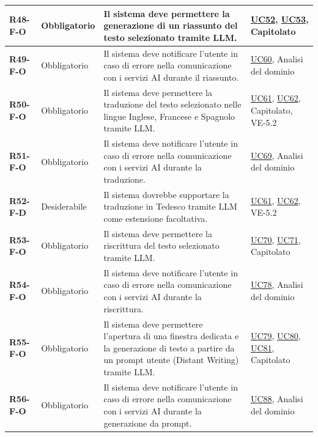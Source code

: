 \begin{longtable}{|p{2.5cm}|p{2.2cm}|p{6.8cm}|p{2.7cm}|}
	\textbf{R48-F-O} & Obbligatorio & Il sistema deve permettere la generazione di un riassunto del testo selezionato tramite LLM. & \hyperlink{uc52}{UC52}, \hyperlink{uc53}{UC53}, Capitolato \\ \hline
	\textbf{R49-F-O} & Obbligatorio & Il sistema deve notificare l'utente in caso di errore nella comunicazione con i servizi AI durante il riassunto. & \hyperlink{uc60}{UC60}, Analisi del dominio \\ \hline
	\textbf{R50-F-O} & Obbligatorio & Il sistema deve permettere la traduzione del testo selezionato nelle lingue Inglese, Francese e Spagnolo tramite LLM. & \hyperlink{uc61}{UC61}, \hyperlink{uc62}{UC62}, Capitolato, VE-5.2 \\ \hline
	\textbf{R51-F-O} & Obbligatorio & Il sistema deve notificare l'utente in caso di errore nella comunicazione con i servizi AI durante la traduzione. & \hyperlink{uc69}{UC69}, Analisi del dominio \\ \hline
	\textbf{R52-F-D} & Desiderabile & Il sistema dovrebbe supportare la traduzione in Tedesco tramite LLM come estensione facoltativa. & \hyperlink{uc61}{UC61}, \hyperlink{uc62}{UC62}, VE-5.2 \\ \hline
	\textbf{R53-F-O} & Obbligatorio & Il sistema deve permettere la riscrittura del testo selezionato tramite LLM. & \hyperlink{uc70}{UC70}, \hyperlink{uc71}{UC71}, Capitolato \\ \hline
	\textbf{R54-F-O} & Obbligatorio & Il sistema deve notificare l'utente in caso di errore nella comunicazione con i servizi AI durante la riscrittura. & \hyperlink{uc78}{UC78}, Analisi del dominio \\ \hline
	\textbf{R55-F-O} & Obbligatorio & Il sistema deve permettere l'apertura di una finestra dedicata e la generazione di testo a partire da un prompt utente (Distant Writing) tramite LLM. & \hyperlink{uc79}{UC79}, \hyperlink{uc80}{UC80}, \hyperlink{uc81}{UC81}, Capitolato \\ \hline
	\textbf{R56-F-O} & Obbligatorio & Il sistema deve notificare l'utente in caso di errore nella comunicazione con i servizi AI durante la generazione da prompt. & \hyperlink{uc88}{UC88}, Analisi del dominio \\ \hline


\end{longtable}
